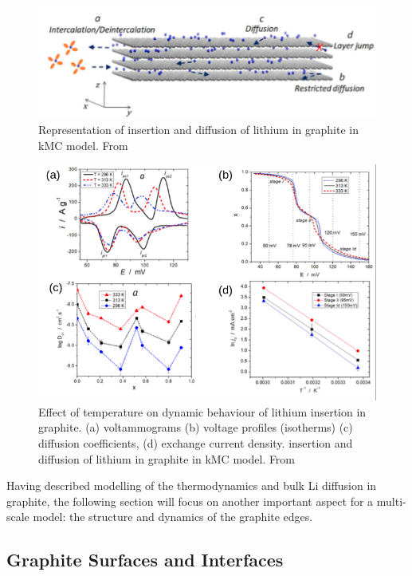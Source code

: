 \documentclass[../main.tex]{subfiles}
\begin{document}
\begin{figure}
    \centering
    \includegraphics[scale=2]{figures/kmc_scheme.png}
    \caption{Representation of insertion and diffusion of lithium in graphite in kMC model.  From }
    \label{fig:graphite_kmcscheme}
\end{figure}

\begin{figure}
    \centering
    \includegraphics[scale=2]{figures/kmc_observables.png}
    \caption{Effect of temperature on dynamic behaviour of lithium insertion in graphite. (a) voltammograms (b) voltage profiles (isotherms) (c) diffusion coefficients, (d) exchange current density. insertion and diffusion of lithium in graphite in kMC model.  From }
    \label{fig:graphite_kmcobservables}
\end{figure}


Having described modelling of the thermodynamics and bulk Li diffusion in graphite, the following section will focus on another important aspect for a multi-scale model: the structure and dynamics of the graphite edges.


\subsection{Graphite Surfaces and Interfaces}
\label{sec:anodes_surfaces_interfaces}
\end{document}
